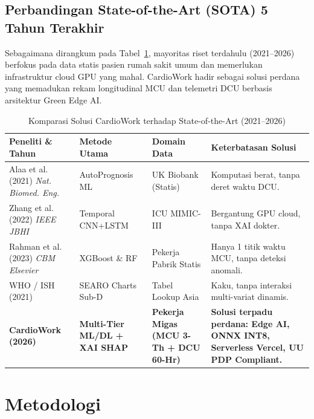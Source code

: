 \documentclass[a4paper,11pt]{article}
\begin{document}
\subsection{Perbandingan State-of-the-Art (SOTA) 5 Tahun Terakhir}
Sebagaimana dirangkum pada Tabel~\ref{tab:sota_comparison}, mayoritas riset terdahulu (2021--2026) berfokus pada data statis pasien rumah sakit umum dan memerlukan infrastruktur cloud GPU yang mahal. CardioWork hadir sebagai solusi perdana yang memadukan rekam longitudinal MCU dan telemetri DCU berbasis arsitektur Green Edge AI.

\begin{table}[h!]
\centering
\small
\caption{Komparasi Solusi CardioWork terhadap State-of-the-Art (2021--2026)}
\label{tab:sota_comparison}
\begin{tabularx}{\textwidth}{p{3.2cm}p{3cm}p{3.2cm}X}
\toprule
\textbf{Peneliti \& Tahun} & \textbf{Metode Utama} & \textbf{Domain Data} & \textbf{Keterbatasan Solusi} \\
\midrule
Alaa et al. (2021) \textit{Nat. Biomed. Eng.} & AutoPrognosis ML & UK Biobank (Statis) & Komputasi berat, tanpa deret waktu DCU. \\
Zhang et al. (2022) \textit{IEEE JBHI} & Temporal CNN+LSTM & ICU MIMIC-III & Bergantung GPU cloud, tanpa XAI dokter. \\
Rahman et al. (2023) \textit{CBM Elsevier} & XGBoost \& RF & Pekerja Pabrik Statis & Hanya 1 titik waktu MCU, tanpa deteksi anomali. \\
WHO / ISH (2021) & SEARO Charts Sub-D & Tabel Lookup Asia & Kaku, tanpa interaksi multi-variat dinamis. \\
\textbf{CardioWork (2026)} & \textbf{Multi-Tier ML/DL + XAI SHAP} & \textbf{Pekerja Migas (MCU 3-Th + DCU 60-Hr)} & \textbf{Solusi terpadu perdana: Edge AI, ONNX INT8, Serverless Vercel, UU PDP Compliant.} \\
\bottomrule
\end{tabularx}
\end{table}

\section{Metodologi}
\end{document}
